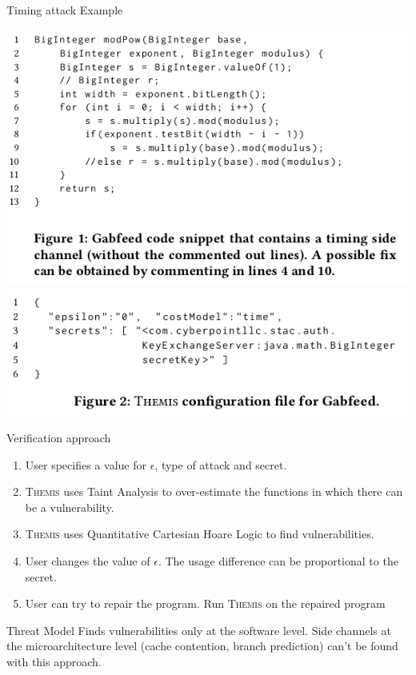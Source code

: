 \documentclass[page number]{beamer}
\begin{document}
\begin{frame}{Timing attack Example}
  \begin{center}
    \includegraphics[scale=0.38]{img_chen/1.png}\\
    \includegraphics[scale=0.38]{img_chen/2.png}
  \end{center}
\end{frame}

\begin{frame}{Verification approach}
  \begin{enumerate}
  \item User specifies a value for $\epsilon$, type of attack and secret.
  \item \textsc{Themis} uses Taint Analysis to over-estimate the functions in which there can be a vulnerability.
  \item \textsc{Themis} uses Quantitative Cartesian Hoare Logic to find vulnerabilities.
  \item User changes the value of $\epsilon$. The usage difference can be proportional to the secret.
  \item User can try to repair the program. Run \textsc{Themis} on the repaired program
  \end{enumerate}
  \vfill
  \begin{alertblock}{Threat Model}
    Finds vulnerabilities only at the software level. Side channels at the microarchitecture level (cache contention, branch prediction) can't be found with this approach.
  \end{alertblock}
\end{frame}
\end{document}
